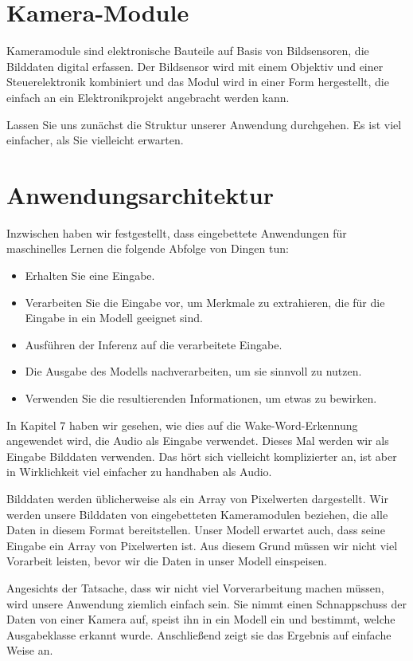 \section{Kamera-Module}

Kameramodule sind elektronische Bauteile auf Basis von Bildsensoren, die Bilddaten digital erfassen. Der Bildsensor wird mit einem Objektiv und einer Steuerelektronik kombiniert und das Modul wird in einer Form hergestellt, die einfach an ein Elektronikprojekt angebracht werden kann.

Lassen Sie uns zunächst die Struktur unserer Anwendung durchgehen. Es ist viel einfacher, als Sie vielleicht erwarten.


\section{Anwendungsarchitektur}

Inzwischen haben wir festgestellt, dass eingebettete Anwendungen für maschinelles Lernen die folgende Abfolge von Dingen tun:

\begin{itemize}
  \item Erhalten Sie eine Eingabe.
  \item Verarbeiten Sie die Eingabe vor, um Merkmale zu extrahieren, die für die Eingabe in ein Modell geeignet sind.
  \item Ausführen der Inferenz auf die verarbeitete Eingabe.
  \item Die Ausgabe des Modells nachverarbeiten, um sie sinnvoll zu nutzen.
  \item Verwenden Sie die resultierenden Informationen, um etwas zu bewirken.
\end{itemize}

In Kapitel 7 haben wir gesehen, wie dies auf die Wake-Word-Erkennung angewendet wird, die Audio als Eingabe verwendet. Dieses Mal werden wir als Eingabe Bilddaten verwenden. Das hört sich vielleicht komplizierter an, ist aber in Wirklichkeit viel einfacher zu handhaben als Audio.

Bilddaten werden üblicherweise als ein Array von Pixelwerten dargestellt. Wir werden unsere Bilddaten von eingebetteten Kameramodulen beziehen, die alle Daten in diesem Format bereitstellen. Unser Modell erwartet auch, dass seine Eingabe ein Array von Pixelwerten ist. Aus diesem Grund müssen wir nicht viel Vorarbeit leisten, bevor wir die Daten in unser Modell einspeisen.

Angesichts der Tatsache, dass wir nicht viel Vorverarbeitung machen müssen, wird unsere Anwendung ziemlich einfach sein. Sie nimmt einen Schnappschuss der Daten von einer Kamera auf, speist ihn in ein Modell ein und bestimmt, welche Ausgabeklasse erkannt wurde. Anschließend zeigt sie das Ergebnis auf einfache Weise an.

